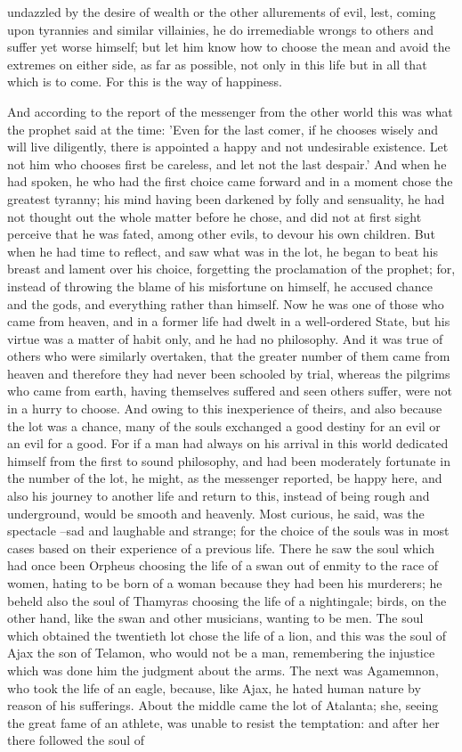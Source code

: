 undazzled by the desire of wealth or the other allurements of evil, lest, coming upon tyrannies and similar villainies, he do irremediable wrongs to others and suffer yet worse himself; but let him know how to choose the mean and avoid the extremes on either side, as far as possible, not only in this life but in all that which is to come. For this is the way of happiness.

And according to the report of the messenger from the other world this was what the prophet said at the time: 'Even for the last comer, if he chooses wisely and will live diligently, there is appointed a happy and not undesirable existence. Let not him who chooses first be careless, and let not the last despair.' And when he had spoken, he who had the first choice came forward and in a moment chose the greatest tyranny; his mind having been darkened by folly and sensuality, he had not thought out the whole matter before he chose, and did not at first sight perceive that he was fated, among other evils, to devour his own children. But when he had time to reflect, and saw what was in the lot, he began to beat his breast and lament over his choice, forgetting the proclamation of the prophet; for, instead of throwing the blame of his misfortune on himself, he accused chance and the gods, and everything rather than himself. Now he was one of those who came from heaven, and in a former life had dwelt in a well-ordered State, but his virtue was a matter of habit only, and he had no philosophy. And it was true of others who were similarly overtaken, that the greater number of them came from heaven and therefore they had never been schooled by trial, whereas the pilgrims who came from earth, having themselves suffered and seen others suffer, were not in a hurry to choose. And owing to this inexperience of theirs, and also because the lot was a chance, many of the souls exchanged a good destiny for an evil or an evil for a good. For if a man had always on his arrival in this world dedicated himself from the first to sound philosophy, and had been moderately fortunate in the number of the lot, he might, as the messenger reported, be happy here, and also his journey to another life and return to this, instead of being rough and underground, would be smooth and heavenly. Most curious, he said, was the spectacle --sad and laughable and strange; for the choice of the souls was in most cases based on their experience of a previous life. There he saw the soul which had once been Orpheus choosing the life of a swan out of enmity to the race of women, hating to be born of a woman because they had been his murderers; he beheld also the soul of Thamyras choosing the life of a nightingale; birds, on the other hand, like the swan and other musicians, wanting to be men. The soul which obtained the twentieth lot chose the life of a lion, and this was the soul of Ajax the son of Telamon, who would not be a man, remembering the injustice which was done him the judgment about the arms. The next was Agamemnon, who took the life of an eagle, because, like Ajax, he hated human nature by reason of his sufferings. About the middle came the lot of Atalanta; she, seeing the great fame of an athlete, was unable to resist the temptation: and after her there followed the soul of 